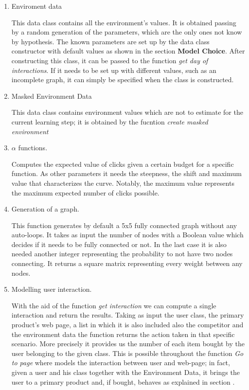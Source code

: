 \begin{enumerate}
     \item Enviroment data
     
     This data class contains all the environment's values. It is obtained passing by a random generation of the parameters, which are the only ones not know by hypothesis. The known parameters are set up by the data class constructor with default values as shown in the section \textbf{Model Choice}. After constructing this class, it can be passed to the function  \textit{get day of interactions}. If it needs to be set up with different values, such as an incomplete graph, it can simply be specified when the class is constructed.
     
     \item  Masked Environment Data
     
     This data class contains environment values which are not to estimate for the current learning step; it is obtained by the fucntion \textit{create masked environment} 
    
     \item $\alpha$ functions.
     
     Computes the expected value of clicks given a certain budget for a specific function. As other parameters it needs the steepness, the shift and maximum value that characterizes the curve. Notably, the maximum value represents the maximum expected number of clicks possible.
  
    \item Generation of a graph.
    
    This function generates by default a 5x5 fully connected graph without any auto-loops. It takes as input the number of nodes with a Boolean value which decides if it needs to be fully connected or not. In the last case it is also needed another integer representing the probability to not have two nodes connecting. It returns a square matrix representing every weight between any nodes.
   
    \item Modelling user interaction.
    
    With the aid of the function \textit{get interaction} we can compute a single interaction and return the results. Taking as input the user class, the primary product's web page, a list in which it is also included also the competitor and the environment data the function returns the action taken in that specific scenario. More precisely it provides us the number of each item bought by the user belonging to the given class.
    This is possible throughout the function \textit{Go to page} where models the interaction between user and web-page; in fact, given a user and his class together with the Environment Data, it brings the user to a primary product and, if bought, behaves as explained in section .
    

\end{enumerate}
